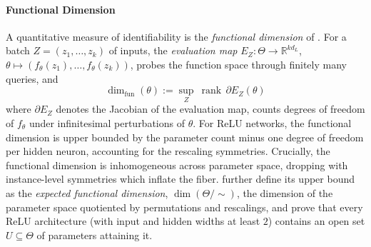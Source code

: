 \documentclass[mathematics,review,submit,moreauthors]{Definitions/mdpi}
\begin{document}
\paragraph{Functional Dimension}
A quantitative measure of identifiability is the \emph{functional dimension} of \citet{elisendagrigsby2025aim}.
For a batch $Z=(z_1,\dots,z_k)$ of inputs, the \emph{evaluation map} $E_Z:\Theta\to\mathbb{R}^{kd_L}$, $\theta\mapsto(f_\theta(z_1),\dots,f_\theta(z_k))$, probes the function space through finitely many queries, and
\begin{equation*}
    \dim_{\mathrm{fun}}(\theta):=\sup_{Z}\ \operatorname{rank}\,\partial E_Z(\theta)
\end{equation*}
where $\partial E_Z$ denotes the Jacobian of the evaluation map, counts degrees of freedom of $f_\theta$ under infinitesimal perturbations of $\theta$.
For ReLU networks, the functional dimension is upper bounded by the parameter count minus one degree of freedom per hidden neuron, accounting for the rescaling symmetries.
Crucially, the functional dimension is inhomogeneous across parameter space, dropping with instance-level symmetries which inflate the fiber.
\citet{grillo2026} further define its upper bound as the \emph{expected functional dimension}, $\dim(\Theta/\!\sim)$, the dimension of the parameter space quotiented by permutations and rescalings, and prove that every ReLU architecture (with input and hidden widths at least $2$) contains an open set $U\subseteq\Theta$ of parameters attaining it.
\end{document}

